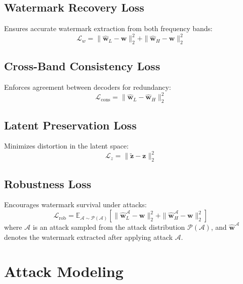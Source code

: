 \documentclass[11pt]{article}
\begin{document}
\subsection{Watermark Recovery Loss}

Ensures accurate watermark extraction from both frequency bands:
\begin{equation}
    \mathcal{L}_w = \|\hat{\mathbf{w}}_L - \mathbf{w}\|_2^2 + \|\hat{\mathbf{w}}_H - \mathbf{w}\|_2^2
\end{equation}

\subsection{Cross-Band Consistency Loss}

Enforces agreement between decoders for redundancy:
\begin{equation}
    \mathcal{L}_{\text{cons}} = \|\hat{\mathbf{w}}_L - \hat{\mathbf{w}}_H\|_2^2
\end{equation}

\subsection{Latent Preservation Loss}

Minimizes distortion in the latent space:
\begin{equation}
    \mathcal{L}_z = \|\tilde{\mathbf{z}} - \mathbf{z}\|_2^2
\end{equation}

\subsection{Robustness Loss}

Encourages watermark survival under attacks:
\begin{equation}
    \mathcal{L}_{\text{rob}} = \mathbb{E}_{\mathcal{A} \sim \mathcal{P}(\mathcal{A})}\left[\|\hat{\mathbf{w}}_L^{\mathcal{A}} - \mathbf{w}\|_2^2 + \|\hat{\mathbf{w}}_H^{\mathcal{A}} - \mathbf{w}\|_2^2\right]
\end{equation}
where $\mathcal{A}$ is an attack sampled from the attack distribution $\mathcal{P}(\mathcal{A})$, and $\hat{\mathbf{w}}^{\mathcal{A}}$ denotes the watermark extracted after applying attack $\mathcal{A}$.

\section{Attack Modeling}
\end{document}
